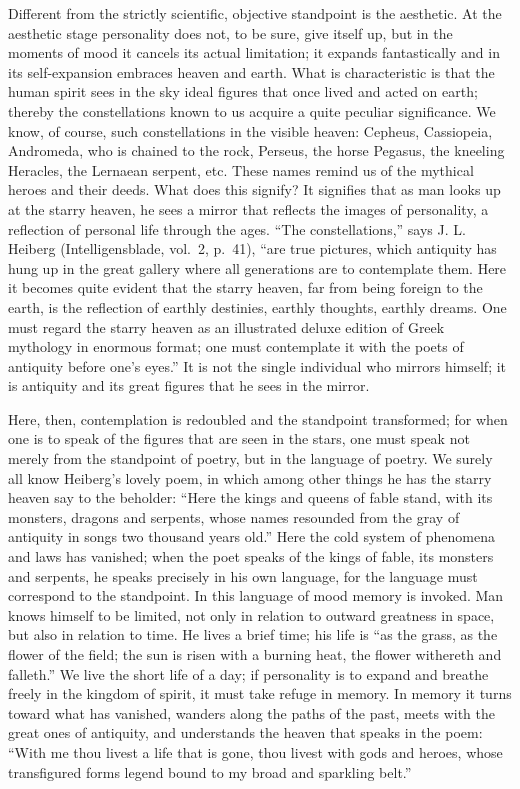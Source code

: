 \documentclass[12pt]{book}
\newcommand{\opage}[1]{\marginnote{\footnotesize\textit{[#1]}}}
\begin{document}
Different from the strictly scientific, objective standpoint is the
aesthetic. At the aesthetic stage personality does not, to be sure, give
itself up, but in the moments of mood it cancels its actual
\opage{200}\setcounter{footnote}{0}%
limitation; it expands fantastically and in its self-expansion embraces
heaven and earth. What is characteristic is that the human spirit sees in
the sky ideal figures that once lived and acted on earth; thereby the
constellations known to us acquire a quite peculiar significance. We know,
of course, such constellations in the visible heaven: Cepheus, Cassiopeia,
Andromeda, who is chained to the rock, Perseus, the horse Pegasus, the
kneeling Heracles, the Lernaean serpent, etc. These names remind us of the
mythical heroes and their deeds. What does this signify? It signifies
that as man looks up at the starry heaven, he sees a mirror that reflects
the images of personality, a reflection of personal life through the ages.
``The constellations,'' says J. L. Heiberg (Intelligensblade, vol.~2,
p.~41), ``are true pictures, which antiquity has hung up in the great
gallery where all generations are to contemplate them. Here it becomes
quite evident that the starry heaven, far from being foreign to the earth,
is the reflection of earthly destinies, earthly thoughts, earthly dreams.
One must regard the starry heaven as an illustrated deluxe edition of Greek
mythology in enormous format; one must contemplate it with the poets of
antiquity before one's eyes.'' It is not the single individual who mirrors
himself; it is antiquity and its great figures that he sees in the mirror.

Here, then, contemplation is redoubled and the standpoint transformed; for
when one is to speak of the figures that are seen in the stars, one must
speak not merely from the standpoint of poetry, but in the language of
poetry. We surely all know Heiberg's lovely poem, in which among other
things he has the starry heaven say to the beholder: ``Here the kings and
queens of fable stand, with its monsters, dragons and serpents, whose
names resounded from the gray of antiquity in songs two thousand years
old.'' Here the cold
\opage{201}\setcounter{footnote}{0}%
system of phenomena and laws has vanished; when the poet speaks of the
kings of fable, its monsters and serpents, he speaks precisely in his own
language, for the language must correspond to the standpoint. In this
language of mood memory is invoked. Man knows himself to be limited, not
only in relation to outward greatness in space, but also in relation to
time. He lives a brief time; his life is ``as the grass, as the flower of
the field; the sun is risen with a burning heat, the flower withereth and
falleth.'' We live the short life of a day; if personality is to expand
and breathe freely in the kingdom of spirit, it must take refuge in memory.
In memory it turns toward what has vanished, wanders along the paths of the
past, meets with the great ones of antiquity, and understands the heaven
that speaks in the poem: ``With me thou livest a life that is gone, thou
livest with gods and heroes, whose transfigured forms legend bound to my
broad and sparkling belt.''
\end{document}
